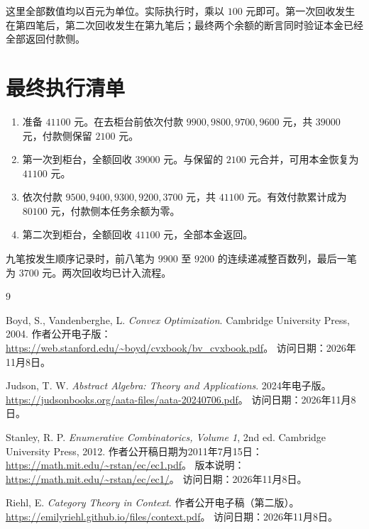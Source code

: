 \documentclass[UTF8,a4paper]{ctexbook}
\theoremstyle{definition}
\numberwithin{equation}{chapter}
\newcommand{\1}{\mathbf{1}}
\begin{document}
这里全部数值均以百元为单位。实际执行时，乘以 $100$ 元即可。第一次回收发生在第四笔后，第二次回收发生在第九笔后；最终两个余额的断言同时验证本金已经全部返回付款侧。

\section{最终执行清单}
\begin{enumerate}
\item 准备 $41100$ 元。在去柜台前依次付款 $9900,9800,9700,9600$ 元，共 $39000$ 元，付款侧保留 $2100$ 元。
\item 第一次到柜台，全额回收 $39000$ 元。与保留的 $2100$ 元合并，可用本金恢复为 $41100$ 元。
\item 依次付款 $9500,9400,9300,9200,3700$ 元，共 $41100$ 元。有效付款累计成为 $80100$ 元，付款侧本任务余额为零。
\item 第二次到柜台，全额回收 $41100$ 元，全部本金返回。
\end{enumerate}

九笔按发生顺序记录时，前八笔为 $9900$ 至 $9200$ 的连续递减整百数列，最后一笔为 $3700$ 元。两次回收均已计入流程。

\backmatter
\begin{thebibliography}{9}
Boyd, S., Vandenberghe, L.
\textit{Convex Optimization}.
Cambridge University Press, 2004.
作者公开电子版：\url{https://web.stanford.edu/~boyd/cvxbook/bv_cvxbook.pdf}。
访问日期：2026年11月8日。

Judson, T. W.
\textit{Abstract Algebra: Theory and Applications}.
2024年电子版。
\url{https://judsonbooks.org/aata-files/aata-20240706.pdf}。
访问日期：2026年11月8日。

Stanley, R. P.
\textit{Enumerative Combinatorics, Volume 1}, 2nd ed.
Cambridge University Press, 2012.
作者公开稿日期为2011年7月15日：\url{https://math.mit.edu/~rstan/ec/ec1.pdf}。
版本说明：\url{https://math.mit.edu/~rstan/ec/ec1/}。
访问日期：2026年11月8日。

Riehl, E.
\textit{Category Theory in Context}.
作者公开电子稿（第二版）。
\url{https://emilyriehl.github.io/files/context.pdf}。
访问日期：2026年11月8日。
\end{thebibliography}
\end{document}
